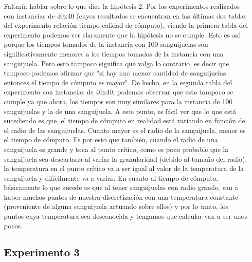 \par Faltaría hablar sobre lo que dice la hipótesis 2. Por los experimentos realizados con instancias de 40x40 (cuyos resultados se encuentran en las últimas dos tablas del experimento relación tiempo-calidad de cómputo), viendo la primera tabla del experimento podemos ver claramente que la hipótesis no se cumple. Esto es así porque los tiempos tomados de la instancia con 100 sanguijuelas son significativamente menores a los tiempos tomados de la instancia con una sanguijuela. Pero esto tampoco significa que valga lo contrario, es decir que tampoco podemos afirmar que "si hay una menor cantidad de sanguijuelas entonces el tiempo de cómputo es mayor". De hecho, en la segunda tabla del experimento con instancias de 40x40, podemos observar que esto tampoco se cumple ya que ahora, los tiempos son muy similares para la instancia de 100 sanguijuelas y la de una sanguijuela. A este punto, es fácil ver que lo que está sucediendo es que, el tiempo de cómputo en realidad está variando en función de el radio de las sanguijuelas. Cuanto mayor es el radio de la sanguijuela, menor es el tiempo de cómputo. Es por esto que también, cuando el radio de una sanguijuela es grande y toca al punto crítico, como es poco probable que la sanguijuela sea descartada al variar la granularidad (debido al tamaño del radio), la temperatura en el punto crítico va a ser igual al valor de la temperatura de la sanguijuela y difícilmente va a variar. En cuanto al tiempo de cómputo, básicamente lo que sucede es que al tener sanguijuelas con radio grande, van a haber muchos puntos de nuestra discretización con una temperatura constante (proveniente de alguna sanguijuela actuando sobre ellos) y por lo tanto, los puntos cuya temperatura sea desconocida y tengamos que calcular van a ser unos pocos.

\subsection{Experimento 3}

